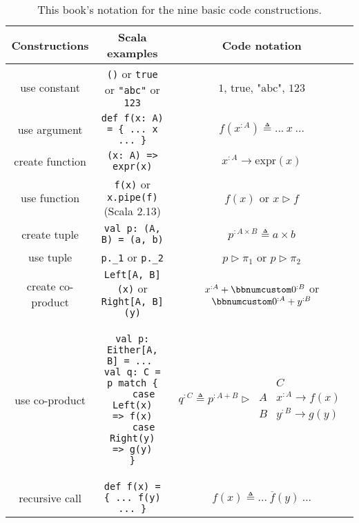 \begin{table}
\begin{centering}
\begin{tabular}{|c|c|c|}
\hline 
\textbf{\small{}Constructions} & \textbf{\small{}Scala examples} & \textbf{\small{}Code notation}\tabularnewline
\hline 
\hline 
{\small{}use constant} & {\small{}}\lstinline!()!{\small{} or }\lstinline!true!{\small{}
or }\lstinline!"abc"!{\small{} or }\lstinline!123! & {\small{}$1$, $\text{true}$, $\text{"abc"}$, $123$}\tabularnewline
\hline 
{\small{}use argument} & {\small{}}\lstinline!def f(x: A) = { ... x ... }! & {\small{}$f(x^{:A})\triangleq...~x~...$}\tabularnewline
\hline 
{\small{}create function} & {\small{}}\lstinline!(x: A) => expr(x)! & {\small{}$x^{:A}\rightarrow\text{expr}\left(x\right)$}\tabularnewline
\hline 
{\small{}use function} & {\small{}}\lstinline!f(x)!{\small{} or }\lstinline!x.pipe(f)!{\small{}
(Scala 2.13)} & {\small{}$f(x)$ or $x\triangleright f$}\tabularnewline
\hline 
{\small{}create tuple} & {\small{}}\lstinline!val p: (A, B) = (a, b)! & {\small{}$p^{:A\times B}\triangleq a\times b$}\tabularnewline
\hline 
{\small{}use tuple} & {\small{}}\lstinline!p._1!{\small{} or }\lstinline!p._2! & {\small{}$p\triangleright\pi_{1}$ or $p\triangleright\pi_{2}$}\tabularnewline
\hline 
{\small{}create co-product} & {\small{}}\lstinline!Left[A, B](x)!{\small{} or }\lstinline!Right[A, B](y)! & {\small{}$x^{:A}+\bbnum 0^{:B}$ or $\bbnum 0^{:A}+y^{:B}$}\tabularnewline
\hline 
{\small{}use co-product} & {\small{}\hspace*{-0.013\linewidth}}%
\begin{minipage}[c][1\totalheight][b]{0.33\columnwidth}%
{\small{}\vspace{0.28\baselineskip}
}
\begin{lstlisting}
val p: Either[A, B] = ... 
val q: C = p match {
    case Left(x)   => f(x)
    case Right(y)  => g(y)
}
\end{lstlisting}
{\small{}\vspace{-0.1\baselineskip}
}%
\end{minipage}{\small{} \hspace*{-0.009\linewidth}} & {\small{}$q^{:C}\triangleq p^{:A+B}\triangleright\,\begin{array}{|c||c|}
 & C\\
\hline A & x^{:A}\rightarrow f(x)\\
B & y^{:B}\rightarrow g(y)
\end{array}$}\tabularnewline
\hline 
{\small{}recursive call} & {\small{}}\lstinline!def f(x) = { ... f(y) ... }! & {\small{}$f(x)\triangleq...~\overline{f}(y)~...$}\tabularnewline
\hline 
\end{tabular}
\par\end{centering}
\caption{This book\textsf{'}s notation for the nine basic code constructions.\label{tab:Mathematical-notation-for-basic-code-constructions}}
\end{table}



